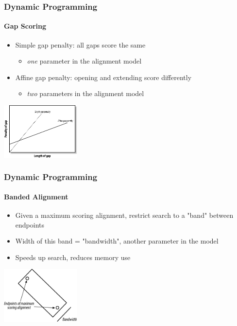 \documentclass[table]{beamer}
\begin{document}
    \begin{frame}
     \frametitle{Dynamic Programming}
     \framesubtitle{Gap Scoring}
       \begin{itemize}
         \item Simple gap penalty: all gaps score the same
         \begin{itemize}
           \item \emph{one} parameter in the alignment model
         \end{itemize}
         \item Affine gap penalty: opening and extending score differently
         \begin{itemize}
           \item \emph{two} parameters in the alignment model
         \end{itemize}
       \end{itemize}
       \begin{center}
         \includegraphics[width=0.3\textwidth]{images/gap_scores} 
       \end{center}
     \end{frame}  
   
    \begin{frame}
     \frametitle{Dynamic Programming}
     \framesubtitle{Banded Alignment}
       \begin{itemize}
         \item Given a maximum scoring alignment, restrict search to a "band" between endpoints
         \item Width of this band = "bandwidth", another parameter in the model
         \item Speeds up search, reduces memory use
       \end{itemize}
       \begin{center}
         \includegraphics[width=0.3\textwidth]{images/banded} 
       \end{center}
     \end{frame}     
\end{document}
